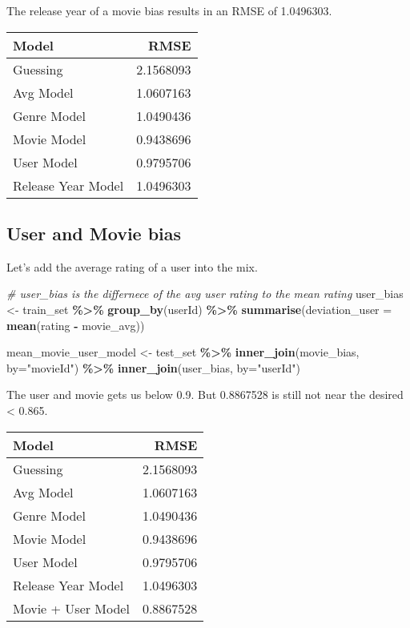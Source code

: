 \documentclass[
]{article}
\newenvironment{Shaded}{\begin{snugshade}}{\end{snugshade}}
\newcommand{\AttributeTok}[1]{\textcolor[rgb]{0.13,0.29,0.53}{#1}}
\newcommand{\CommentTok}[1]{\textcolor[rgb]{0.56,0.35,0.01}{\textit{#1}}}
\newcommand{\FunctionTok}[1]{\textcolor[rgb]{0.13,0.29,0.53}{\textbf{#1}}}
\newcommand{\NormalTok}[1]{#1}
\newcommand{\OtherTok}[1]{\textcolor[rgb]{0.56,0.35,0.01}{#1}}
\newcommand{\SpecialCharTok}[1]{\textcolor[rgb]{0.81,0.36,0.00}{\textbf{#1}}}
\newcommand{\StringTok}[1]{\textcolor[rgb]{0.31,0.60,0.02}{#1}}
\begin{document}
The release year of a movie bias results in an RMSE of 1.0496303.

\begin{tabular}{l|r}
\hline
Model & RMSE\\
\hline
Guessing & 2.1568093\\
\hline
Avg Model & 1.0607163\\
\hline
Genre Model & 1.0490436\\
\hline
Movie Model & 0.9438696\\
\hline
User Model & 0.9795706\\
\hline
Release Year Model & 1.0496303\\
\hline
\end{tabular}

\hypertarget{user-and-movie-bias}{%
\subsection{User and Movie bias}\label{user-and-movie-bias}}

Let's add the average rating of a user into the mix.

\begin{Shaded}
\begin{Highlighting}[]
\CommentTok{\# user\_bias is the differnece of the avg user rating to the mean rating}
\NormalTok{user\_bias }\OtherTok{\textless{}{-}}\NormalTok{ train\_set }\SpecialCharTok{\%\textgreater{}\%}
  \FunctionTok{group\_by}\NormalTok{(userId) }\SpecialCharTok{\%\textgreater{}\%}
  \FunctionTok{summarise}\NormalTok{(}\AttributeTok{deviation\_user =} \FunctionTok{mean}\NormalTok{(rating }\SpecialCharTok{{-}}\NormalTok{ movie\_avg))}

\NormalTok{mean\_movie\_user\_model }\OtherTok{\textless{}{-}}\NormalTok{ test\_set }\SpecialCharTok{\%\textgreater{}\%}
  \FunctionTok{inner\_join}\NormalTok{(movie\_bias, }\AttributeTok{by=}\StringTok{"movieId"}\NormalTok{) }\SpecialCharTok{\%\textgreater{}\%}
  \FunctionTok{inner\_join}\NormalTok{(user\_bias, }\AttributeTok{by=}\StringTok{"userId"}\NormalTok{)}
\end{Highlighting}
\end{Shaded}

The user and movie gets us below 0.9. But 0.8867528 is still not near
the desired \textless{} 0.865.

\begin{tabular}{l|r}
\hline
Model & RMSE\\
\hline
Guessing & 2.1568093\\
\hline
Avg Model & 1.0607163\\
\hline
Genre Model & 1.0490436\\
\hline
Movie Model & 0.9438696\\
\hline
User Model & 0.9795706\\
\hline
Release Year Model & 1.0496303\\
\hline
Movie + User Model & 0.8867528\\
\hline
\end{tabular}
\end{document}
